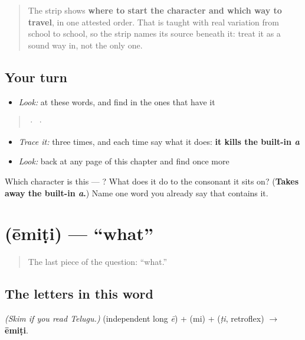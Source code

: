 \begin{quote}
The strip shows \textbf{where to start the character and which way to travel}, in one attested order. That is taught with real variation from school to school, so the strip names its source beneath it: treat it as a sound way in, not the only one.
\end{quote}

\subsection*{Your turn}
\begin{itemize}
\raggedright
  \item \emph{Look:} at these words, and find  in the ones that have it
\end{itemize}

\begin{quote}
  ·    ·  
\end{quote}

\begin{itemize}
\raggedright
  \item \emph{Trace it:}  three times, and each time say what it does: \textbf{it kills the built-in \emph{a}}
  \item \emph{Look:} back at any page of this chapter and find  once more
\end{itemize}

\begin{tcolorbox}[breakable,colback=teal!4,colframe=teal!35!black,title={Before you move on}]
Which character is this — ? What does it do to the consonant it sits on? (\textbf{Takes away the built-in \emph{a}.}) Name one word you already say that contains it.
\end{tcolorbox}
\section[\texorpdfstring{\te{ఏమిటి} (ēmiṭi)}{ఏమిటి (ēmiṭi)}]{ (ēmiṭi) — \textquotedblleft{}what\textquotedblright{}}

\label{lesson:TE-C02-emiti}



\begin{quote}
The last piece of the question: \textquotedblleft{}what.\textquotedblright{}
\end{quote}

\subsection*{The letters in this word}
\emph{(Skim if you read Telugu.)} \textbf{} (independent long \emph{ē}) + \textbf{} (mi) + \textbf{} (\emph{ṭi}, retroflex) $\to$ \textbf{ēmiṭi}.

